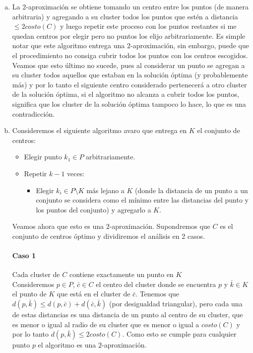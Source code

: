 \documentclass[dcc,uchile]{fcfmcourse}
\theoremstyle{plain}
\theoremstyle{definition}
\begin{document}
\begin{problems}
\problem
\begin{enumerate}[a)]
\item La $2$-aproximación se obtiene tomando un centro entre los puntos (de manera arbitraria) y agregando a su cluster todos los puntos que estén a distancia $\le 2costo(C)$ y luego repetir este proceso con los puntos restantes si me quedan centros por elegir pero no puntos los elijo arbitrariamente. Es simple notar que este algoritmo entrega una $2$-aproximación, sin embargo, puede que el procedimiento no consiga cubrir todos los puntos con los centros escogidos. Veamos que esto último no sucede, pues al considerar un punto se agregan a su cluster todos aquellos que estaban en la solución óptima (y probablemente más) y por lo tanto el siguiente centro considerado pertenecerá a otro cluster de la solución óptima, si el algoritmo no alcanza a cubrir todos los puntos, significa que los cluster de la solución óptima tampoco lo hace, lo que es una contradicción.
\item Consideremos el siguiente algoritmo avaro que entrega en $K$ el conjunto de centros:
\begin{itemize}
\item Elegir punto $k_{1} \in P$ arbitrariamente.
\item Repetir $k-1$ veces:
\begin{itemize}
    \item Elegir $k_{i} \in P\setminus K$ más lejano a $K$ (donde la distancia de un punto a un conjunto se considera como el mínimo entre las distancias del punto y los puntos del conjunto) y agregarlo a $K$.
\end{itemize}
\end{itemize}
Veamos ahora que esto es una $2$-aproximación. Supondremos que $C$ es el conjunto de centros óptimo y dividiremos el análisis en 2 casos.
\paragraph{Caso 1} Cada cluster de $C$ contiene exactamente un punto en $K$\\

Consideremos $p\in P$, $\bar{c} \in C$ el centro del cluster donde se encuentra $p$ y $\bar{k} \in K$ el punto de $K$ que está en el cluster de $\bar{c}$. Tenemos que $d(p,\bar{k}) \le d(p, \bar{c}) + d(\bar{c},\bar{k})$ (por desigualdad triangular), pero cada una de estas distancias es una distancia de un punto al centro de su cluster, que es menor o igual al radio de su cluster que es menor o igual a $costo(C)$ y por lo tanto $d(p, \bar{k}) \le 2costo(C)$. Como esto se cumple para cualquier punto $p$ el algoritmo es una $2$-aproximación.


\end{enumerate}
\end{problems}
\end{document}

